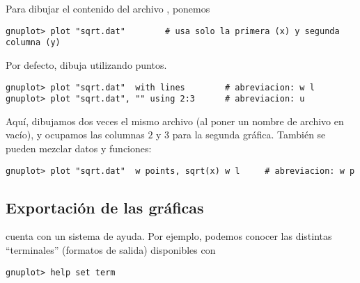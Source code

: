 Para dibujar el contenido del archivo , ponemos
\begin{lstlisting}
gnuplot> plot "sqrt.dat" 		# usa solo la primera (x) y segunda columna (y)
\end{lstlisting}
Por defecto, dibuja utilizando puntos.
\begin{lstlisting}
gnuplot> plot "sqrt.dat"  with lines		# abreviacion: w l
gnuplot> plot "sqrt.dat", "" using 2:3  	# abreviacion: u
\end{lstlisting}
Aquí, dibujamos dos veces el mismo archivo (al poner un nombre de archivo en
vacío), y ocupamos las columnas $2$ y $3$ para la segunda gráfica.
También se pueden mezclar datos y funciones:
\begin{lstlisting}
gnuplot> plot "sqrt.dat"  w points, sqrt(x) w l		# abreviacion: w p
\end{lstlisting}
% 
% 
% 
% 
% 
% 
% 




\subsection{Exportación de las gráficas}
 cuenta con un sistema de ayuda. Por ejemplo, podemos conocer
las distintas ``terminales''  (formatos de salida) disponibles con
\begin{lstlisting}
gnuplot> help set term
\end{lstlisting}


